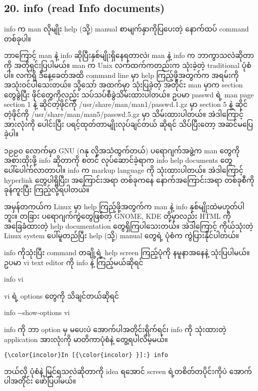\documentclass[11pt]{article}
\begin{document}
    \subsection{20. info (read Info
documents)}\label{info-read-info-documents}

info က man လိုမျိုး help (သို့) manual စာမျက်နှာကိုပြပေးတဲ့ နောက်ထပ်
command တစ်ခုပါ။

ဘာကြောင့် man နဲ့ info ဆိုပြီးနှစ်မျိုးရှိနေရတာလဲ၊ man နဲ့ info က
ဘာကွာသလဲဆိုတာကို အတိုရှင်းပြပါမယ်။ man က Unix လက်ထက်ကတည်းက သုံးခဲ့တဲ့
traditional ပုံစံပါ။ လက်ရှိ ဒီနေ့ခေတ်အထိ command line မှာ help
ကြည့်ဖို့အတွက်က အရမ်းကို အသုံးဝင်ပါသေးတယ်။ သို့သော် အထက်မှာ သုံးပြခဲ့တဲ့
အတိုင်း man မှာက section တွေခွဲပြီး ဖိုင်တွေကိုလည်း
သပ်သပ်စီခွဲသိမ်းထားပါတယ်။ ဥပမာ passwd ရဲ့ man page section 1 နဲ့
ဆိုင်တဲ့ဖိုင်ကို /usr/share/man/man1/passwd.1.gz မှာ section 5 နဲ့
ဆိုင်တဲ့ဖိုင်ကို /usr/share/man/man5/passwd.5.gz မှာ သိမ်းထားပါတယ်။
အဲဒါကြောင့် အားလုံးကို ပေါင်းပြီး ပရင့်ထုတ်တာမျိုးလုပ်ချင်တယ် ဆိုရင်
သိပ်ပြီးတော့ အဆင်မပြေခဲ့ပါ။

၁၉၉၀ လောက်မှာ GNU (ဂနု လို့အသံထွက်တယ်) ပရောဂျက်အဖွဲ့က man တွေကို
အစားထိုးဖို့ info ဆိုတာကို စတင် လုပ်ဆောင်ခဲ့ရာက info help documents
တွေပေါ်ပေါက်လာတာပါ။ info က markup language ကို သုံးထားပါတယ်။ အဲဒါကြောင့်
hyperlink တွေပါရှိပြီး၊ အကြောင်းအရာ တစ်ခုကနေ နောက်အကြောင်းအရာ တစ်ခုစီကို
ခုန်ကူးပြီး ကြည့်လို့ရပါတယ်။

အမှန်တကယ်က Linux မှာ help ကြည့်ဖို့အတွက်က man နဲ့ info
နှစ်မျိုးထဲမဟုတ်ပါဘူး။ တခြား ပရောဂျက်ကွဲတွေဖြစ်တဲ့ GNOME, KDE
တို့မှာလည်း HTML ကို အခြေခံထားတဲ့ help documentation တွေရှိကြပါသေးတယ်။
အဲဒါကြောင့် ကိုယ်သုံးတဲ့ Linux system ပေါ်မူတည်ပြီး help (သို့) manual
တွေရဲ့ ပုံစံက ကွဲပြားနိုင်ပါတယ်။

info ကိုသုံးပြီး command တချို့ရဲ့ help screen ကြည့်ပုံကို နမူနာအနေနဲ့
သုံးပြပါမယ်။\\
ဥပမာ vi text editor ကို info နဲ့ ကြည့်မယ်ဆိုရင်

info vi

vi ရဲ့ options တွေကို သိချင်တယ်ဆိုရင်

info -\/-show-options vi

info ကို ဘာ option မှ မပေးပဲ အောက်ပါအတိုင်းရိုက်ရင်၊ info ကို သုံးထားတဲ့
application အားလုံးကို မာတိကာပုံစံနဲ့ တွေ့ရပါလိမ့်မယ်။

    \begin{Verbatim}[commandchars=\\\{\}]
{\color{incolor}In [{\color{incolor} }]:} info
\end{Verbatim}

    ဘယ်လို ပုံစံနဲ့ မြင်ရသလဲဆိုတာကို idea ရအောင် screen ရဲ့တစိတ်တပိုင်းကိုပဲ
အောက်ပါအတိုင်း ဖော်ပြပါမယ်။
\end{document}
